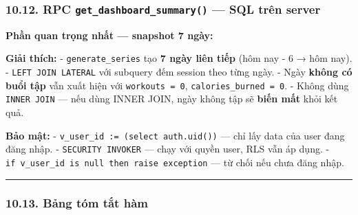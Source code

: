 \documentclass[12pt,a4paper]{article}
\newenvironment{Shaded}{%
  \VerbatimEnvironment
  \begin{quote}\small\ttfamily
}{%
  \end{quote}%
}
\begin{document}
\subsubsection{\texorpdfstring{10.12. RPC
\texttt{get\_dashboard\_summary()} --- SQL trên
server}{10.12. RPC get\_dashboard\_summary() --- SQL trên server}}\label{rpc-get_dashboard_summary-sql-truxean-server}

\textbf{Phần quan trọng nhất --- snapshot 7 ngày:}

\begin{Shaded}
\begin{Highlighting}[]
\OperatorTok{{-}}  \NormalTok{) } 
 
   \NormalTok{(}\OperatorTok{*}\NormalTok{):}  \NormalTok{, }\NormalTok{(}\NormalTok{) }
   
  \OperatorTok{=}\OperatorTok{=} \NormalTok{:}
 
\end{Highlighting}
\end{Shaded}

\textbf{Giải thích:} - \texttt{generate\_series} tạo \textbf{7 ngày liên
tiếp} (hôm nay - 6 → hôm nay). - \texttt{LEFT\ JOIN\ LATERAL} với
subquery đếm session theo từng ngày. - Ngày \textbf{không có buổi tập}
vẫn xuất hiện với \texttt{workouts\ =\ 0},
\texttt{calories\_burned\ =\ 0}. - Không dùng \texttt{INNER\ JOIN} ---
nếu dùng INNER JOIN, ngày không tập sẽ \textbf{biến mất} khỏi kết quả.

\textbf{Bảo mật:} - \texttt{v\_user\_id\ :=\ (select\ auth.uid())} ---
chỉ lấy data của user đang đăng nhập. - \texttt{SECURITY\ INVOKER} ---
chạy với quyền user, RLS vẫn áp dụng. -
\texttt{if\ v\_user\_id\ is\ null\ then\ raise\ exception} --- từ chối
nếu chưa đăng nhập.

\begin{center}\rule{0.5\linewidth}{0.5pt}\end{center}

\subsubsection{10.13. Bảng tóm tắt
hàm}\label{bux1ea3ng-tuxf3m-tux1eaft-huxe0m}
\end{document}
